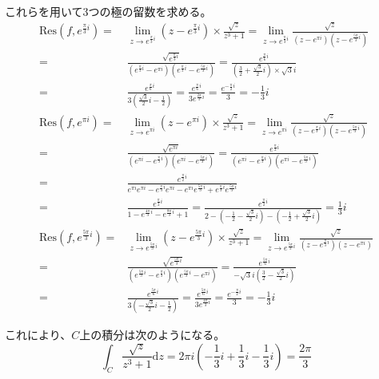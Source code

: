 \documentclass[12pt,b5paper]{ltjsarticle}
\begin{document}
これらを用いて3つの極の留数を求める。
\begin{align}
 \mathrm{Res}(f,e^{\frac{\pi}{3}i})
  =&
 \lim_{z\to e^{\frac{\pi}{3}i}}(z-e^{\frac{\pi}{3}i})\times \frac{\sqrt{z}}{z^3+1}
  =
 \lim_{z\to e^{\frac{\pi}{3}i}} \frac{\sqrt{z}}{(z-e^{\pi i})(z-e^{\frac{5\pi}{3}i})}\\
 =&
 \frac{\sqrt{e^{\frac{\pi}{3}i}}}{(e^{\frac{\pi}{3}i}-e^{\pi i})(e^{\frac{\pi}{3}i}-e^{\frac{5\pi}{3}i})}
 =
 \frac{e^{\frac{\pi}{6}i}}{(\frac{3}{2}+\frac{\sqrt{3}}{2}i)\times \sqrt{3}i}\\
 =& \frac{e^{\frac{\pi}{6}i}}{3(\frac{\sqrt{3}}{2}i-\frac{1}{2})}
 = \frac{e^{\frac{\pi}{6}i}}{3 e^{\frac{2\pi}{3}i}}
 = \frac{e^{-\frac{\pi}{2}i}}{3}
 = -\frac{1}{3}i
 \\
 \mathrm{Res}(f,e^{\pi i})
 =&
 \lim_{z\to e^{\pi i}}(z-e^{\pi i})\times \frac{\sqrt{z}}{z^3+1}
 =
 \lim_{z\to e^{\pi i}} \frac{\sqrt{z}}{(z-e^{\frac{\pi}{3}i})(z-e^{\frac{5\pi}{3}i})}\\
 =&
 \frac{\sqrt{e^{\pi i}}}{(e^{\pi i}-e^{\frac{\pi}{3}i})(e^{\pi i}-e^{\frac{5\pi}{3}i})}
 =
 \frac{e^{\frac{\pi}{2} i}}{(e^{\pi i}-e^{\frac{\pi}{3}i})(e^{\pi i}-e^{\frac{5\pi}{3}i})}
 \\
 =&
 \frac{e^{\frac{\pi}{2} i}}{e^{\pi i}e^{\pi i}-e^{\frac{\pi}{3}i}e^{\pi i}-e^{\pi i}e^{\frac{5\pi}{3}i}+e^{\frac{\pi}{3}i}e^{\frac{5\pi}{3}i}}\\
 =&
 \frac{e^{\frac{\pi}{2} i}}{1-e^{\frac{4\pi}{3}i}-e^{\frac{8\pi}{3}i}+1}
 =
 \frac{e^{\frac{\pi}{2} i}}{2-(-\frac{1}{2}-\frac{\sqrt{3}}{2}i) - (-\frac{1}{2}+\frac{\sqrt{3}}{2}i)}
 =
 \frac{1}{3}i\\
 \mathrm{Res}(f,e^{\frac{5\pi}{3}i})
 =&
 \lim_{z\to e^{\frac{5\pi}{3}i}}(z-e^{\frac{5\pi}{3}i})\times \frac{\sqrt{z}}{z^3+1}
 =
 \lim_{z\to e^{\frac{5\pi}{3}i}} \frac{\sqrt{z}}{(z-e^{\frac{\pi}{3}i})(z-e^{\pi i})}\\
=&
 \frac{\sqrt{e^{\frac{5\pi}{3}i}}}{(e^{\frac{5\pi}{3}i}-e^{\frac{\pi}{3} i})(e^{\frac{5\pi}{3}i}-e^{\pi i})}
 =
 \frac{e^{\frac{5\pi}{6}i}}{-\sqrt{3}i(\frac{3}{2}-\frac{\sqrt{3}}{2}i)}\\
 =&
 \frac{e^{\frac{5\pi}{6}i}}{3(-\frac{\sqrt{3}}{2}i-\frac{1}{2})}
 =
 \frac{e^{\frac{5\pi}{6}i}}{3e^{\frac{4\pi}{3}i}}
 =
 \frac{e^{-\frac{\pi}{2}i}}{3}
 =
 - \frac{1}{3}i
\end{align}


これにより、$C$上の積分は次のようになる。
\begin{equation}
 \int_{C} \frac{\sqrt{z}}{z^3+1}\mathrm{d}z
  = 2\pi i \left(-\frac{1}{3}i +  \frac{1}{3}i - \frac{1}{3}i \right)
  =  \frac{2\pi}{3}
\end{equation}
\end{document}
